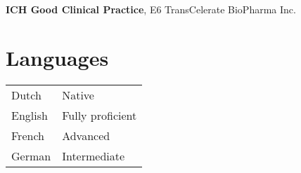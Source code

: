 \documentclass{resume}
\begin{document}
\textbf{ICH Good Clinical Practice}, E6 TransCelerate BioPharma Inc.
\smallskip


\section*{Languages}
\begin{tabularx}{\linewidth}{@{}p{.9in} X@{}}
	Dutch   & Native           \\
	English & Fully proficient \\
	French  & Advanced         \\
	German  & Intermediate     \\
\end{tabularx}
\end{document}

